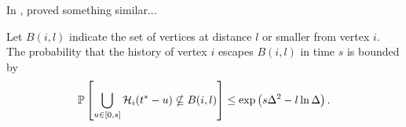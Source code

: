 


	In \cite{Lubetzky2016-wd}, \citeauthor{Lubetzky2016-wd} proved something similar...
		\begin{lemma}
		\label{lem:prob history contained in ball}
			Let $B(i, l)$ indicate the set of vertices at distance $l$ or smaller from vertex $i$. The probability that the history of vertex $i$ escapes $B(i,l)$ in time $s$ is bounded by
			\begin{equation}
				\mathbb{P}\left[\bigcup_{u \in [0, s]}\mathcal{H}_i(t^* - u) \nsubseteq B(i, l)\right] \leq \exp\left(s \Delta^2 - l \ln \Delta \right).
			\end{equation}
		\end{lemma}
